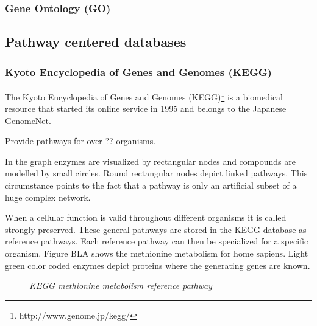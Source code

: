 \subsubsection{Gene Ontology (GO)}

\subsection{Pathway centered databases}

\subsubsection{Kyoto Encyclopedia of Genes and Genomes (KEGG)}

The Kyoto Encyclopedia of Genes and Genomes (KEGG)\footnote{http://www.genome.jp/kegg/} is a biomedical resource that started its online service in 1995 and belongs to the Japanese GenomeNet.

Provide pathways for over ?? organisms.

In the graph enzymes are visualized by rectangular nodes and compounds are modelled by small circles. Round rectangular nodes depict linked pathways. This circumstance points to the fact that a pathway is only an artificial subset of a huge complex network. 


When a cellular function is valid throughout different organisms it is called strongly preserved. These general pathways are stored in the KEGG database as reference pathways. Each reference pathway can then be specialized for a specific organism. Figure BLA shows the methionine metabolism for home sapiens. Light green color coded enzymes depict proteins where the generating genes are known. 

\begin{figure}[ht]
\centering
{} 
\caption[KEGG methionine metabolism reference pathway]{\textit{KEGG methionine metabolism reference pathway}} 
\label{gfx:KEGG_methionine_metabolism_271_reference_pathway}
\end{figure}


